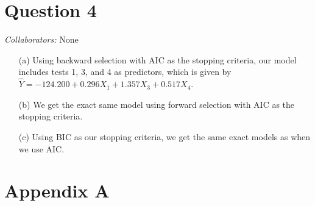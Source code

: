 \documentclass[10pt]{article}
\newcommand{\mycolaba}[1]{\textcolor{colabcol}{\textsl{Collaborators:}} #1}
\begin{document}
\section{Question 4} \noindent
\mycolaba{None}
\begin{itemize}
    \item[(a)] Using backward selection with AIC as the stopping criteria, our model includes tests 1, 3, and 4 as predictors, which is given by 
    \(\hat{Y} = -124.200 + 0.296 X_1 + 1.357 X_3 + 0.517 X_4 \). 
    \item[(b)] We get the exact same model using forward selection with AIC as the stopping criteria. 
    \item[(c)] Using BIC as our stopping criteria, we get the same exact models as when we use AIC. 
\end{itemize}

\section{Appendix A} \noindent
\end{document}
